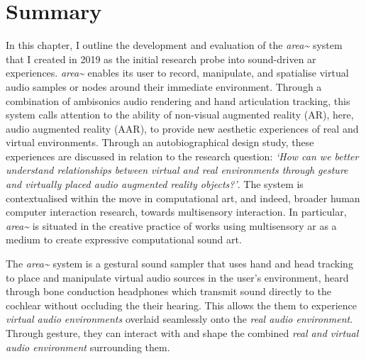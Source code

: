 \clearpage



\section{Summary}\label{sec: area-summary}
In this chapter, I outline the development and evaluation of the \textit{area\textasciitilde{}} system that I created in 2019 as the initial research probe into sound-driven \ac{ar} experiences. \textit{area\textasciitilde{}} enables its user to record, manipulate, and spatialise virtual audio samples or nodes around their immediate environment. Through a combination of ambisonics audio rendering and hand articulation tracking, this system calls attention to the ability of non-visual augmented reality (AR), here, audio augmented reality (AAR), to provide new aesthetic experiences of real and virtual environments.
Through an autobiographical design study, these experiences are discussed in relation to the research question: \textit{`How can we better understand relationships between virtual and real environments through gesture and virtually placed audio augmented reality objects?'}. The system is contextualised within the move in computational art, and indeed, broader human computer interaction research, towards multisensory interaction. In particular, \textit{area\textasciitilde{}} is situated in the creative practice of works using multisensory \ac{ar} as a medium to create expressive computational sound art.

The \textit{area\textasciitilde{}} system is a gestural sound sampler that uses hand and head tracking to place and manipulate virtual audio sources in the user's environment, heard through bone conduction headphones which transmit sound directly to the cochlear without occluding the their hearing. This allows the them to experience \textit{virtual audio environments} overlaid seamlessly onto the \textit{real audio environment}. Through gesture, they can interact with and shape the combined \textit{real and virtual audio environment} surrounding them.

